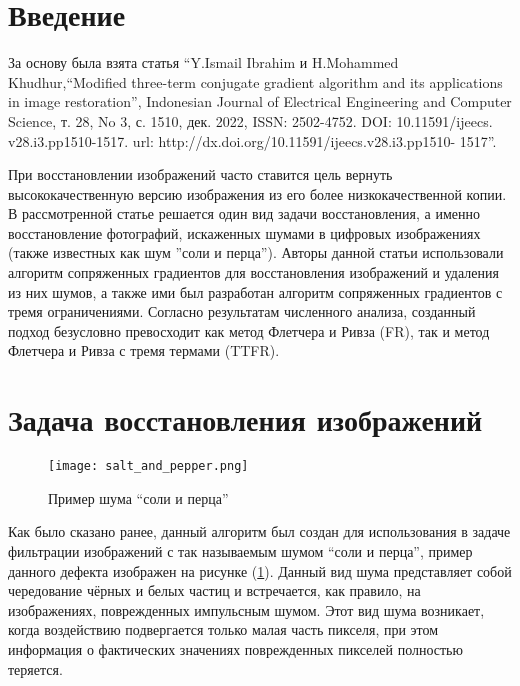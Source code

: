 



\makeatletter
\newcommand{\stackover}{\genfrac{.}{.}\z@{}}
\makeatother




\tableofcontents
\newpage

\section{Введение}

За основу была взята статья ``Y.Ismail Ibrahim и H.Mohammed Khudhur,“Modified
three-term conjugate gradient algorithm and its applications in image
restoration”, Indonesian Journal of Electrical Engineering and Computer Science,
т. 28, No 3, с. 1510, дек. 2022, ISSN: 2502-4752. DOI: 10.11591/ijeecs.
v28.i3.pp1510-1517. url: http://dx.doi.org/10.11591/ijeecs.v28.i3.pp1510- 1517''.

При восстановлении изображений часто ставится цель вернуть высококачественную
версию изображения из его более низкокачественной копии. В рассмотренной статье
решается один вид задачи восстановления, а именно восстановление фотографий,
искаженных шумами в цифровых изображениях (также известных как шум ''соли и
перца''). Авторы данной статьи использовали алгоритм сопряженных градиентов для
восстановления изображений и удаления из них шумов, а также ими был разработан
алгоритм сопряженных градиентов с тремя ограничениями. Согласно результатам
численного анализа, созданный подход безусловно превосходит как метод
Флетчера и Ривза (FR), так и метод Флетчера и Ривза с тремя термами (TTFR).

\newpage
\section{Задача восстановления изображений}

\begin{figure}[ht]
    \centering
    \texttt{[image: salt\_and\_pepper.png]}
    \caption{Пример шума ``соли и перца''}
    \label{fig:salt}
\end{figure}

Как было сказано ранее, данный алгоритм был создан для использования в задаче
фильтрации изображений с так называемым шумом ``соли и перца'', пример данного
дефекта изображен на рисунке (\ref{fig:salt}). Данный вид шума представляет
собой чередование чёрных и белых частиц и встречается, как правило, на
изображениях, поврежденных импульсным шумом. Этот вид шума возникает, когда
воздействию подвергается только малая часть пикселя, при этом информация о
фактических значениях поврежденных пикселей полностью теряется.


